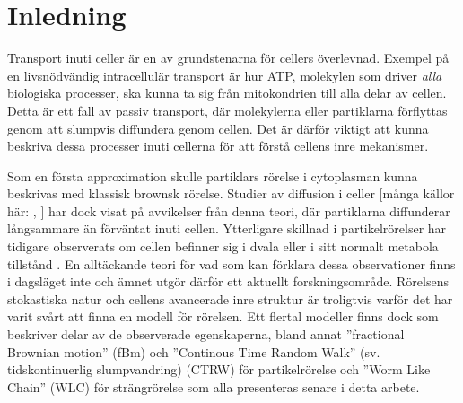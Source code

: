 \chapter{Inledning}



Transport inuti celler är en av grundstenarna för cellers överlevnad. Exempel på en livsnödvändig intracellulär transport är hur ATP, molekylen som driver \emph{alla} biologiska processer, ska kunna ta sig från mitokondrien till alla delar av cellen. Detta är ett fall av passiv transport, där molekylerna eller partiklarna förflyttas genom att slumpvis diffundera genom cellen. Det är därför viktigt att kunna beskriva dessa processer inuti cellerna för att förstå cellens inre mekanismer. 



Som en första approximation skulle partiklars rörelse i cytoplasman kunna beskrivas med klassisk brownsk rörelse. Studier av diffusion i celler [många källor här: \cite{Gou_etal2014}, \cite{Dix_Crowdingeffects2008}] har dock visat på avvikelser från denna teori, där partiklarna diffunderar långsammare än förväntat inuti cellen. Ytterligare skillnad i partikelrörelser har tidigare observerats om cellen befinner sig i dvala eller i sitt normalt metabola tillstånd \cite{}. En alltäckande teori för vad som kan förklara dessa observationer finns i dagsläget inte och ämnet utgör därför ett aktuellt forskningsområde. Rörelsens stokastiska natur och cellens avancerade inre struktur är troligtvis varför det har varit svårt att finna en modell för rörelsen. Ett flertal modeller finns dock som beskriver delar av de observerade egenskaperna, bland annat ''fractional Brownian motion'' (fBm) \cite{Mandelbrot_fBm1968} och ''Continous Time Random Walk'' (sv. tidskontinuerlig slumpvandring) (CTRW) \cite{} för partikelrörelse och ''Worm Like Chain'' (WLC) \cite{} för strängrörelse som alla presenteras senare i detta arbete.


